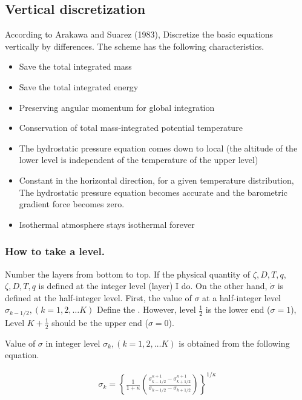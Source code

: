 \hypertarget{vertical-discretization}{%
\subsection{Vertical discretization}\label{vertical-discretization}}

According to Arakawa and Suarez (1983), Discretize the basic equations
vertically by differences. The scheme has the following characteristics.

\begin{itemize}
\item
  Save the total integrated mass
\item
  Save the total integrated energy
\item
  Preserving angular momentum for global integration
\item
  Conservation of total mass-integrated potential temperature
\item
  The hydrostatic pressure equation comes down to local (the altitude of
  the lower level is independent of the temperature of the upper level)
\item
  Constant in the horizontal direction, for a given temperature
  distribution, The hydrostatic pressure equation becomes accurate and
  the barometric gradient force becomes zero.
\item
  Isothermal atmosphere stays isothermal forever
\end{itemize}

\hypertarget{how-to-take-a-level.}{%
\subsubsection{How to take a level.}\label{how-to-take-a-level.}}

Number the layers from bottom to top. If the physical quantity of
\(\zeta,D,T,q\), \(\zeta,D,T,q\) is defined at the integer level (layer)
I do. On the other hand, \(\dot{\sigma}\) is defined at the half-integer
level. First, the value of \(\sigma\) at a half-integer level
\(\sigma_{k-1/2}, (k=1,2,\ldots K)\) Define the . However, level
\(\frac{1}{2}\) is the lower end (\(\sigma=1\)), Level \(K+\frac{1}{2}\)
should be the upper end (\(\sigma=0\)).

Value of \(\sigma\) in integer level \(\sigma_k, (k=1,2,\ldots K)\) is
obtained from the following equation.

\begin{eqnarray}
 \sigma_k = \left\{ \frac{1}{1+\kappa}
                     \left( \frac{  \sigma^{\kappa +1}_{k-1/2}
                                  - \sigma^{\kappa +1}_{k+1/2}      }
                                  { \sigma_{k-1/2} - \sigma_{k+1/2} }
                     \right)
              \right\}^{1/\kappa}
\end{eqnarray}

